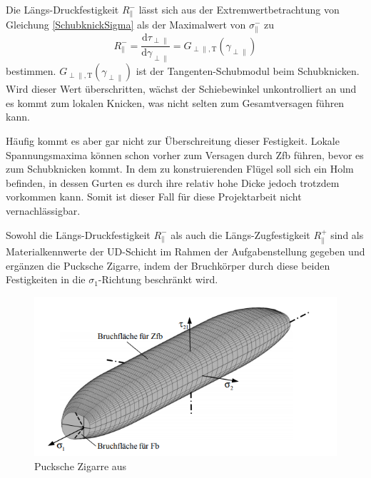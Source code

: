 Die Längs-Druckfestigkeit $R_\parallel^-$ lässt sich aus der Extremwertbetrachtung von Gleichung \ref{SchubknickSigma} als der Maximalwert von $\sigma_{\parallel}^-$ zu
\begin{equation}
	R_\parallel^- = \frac{\mathrm{d}\tau_{\perp\parallel}}{\mathrm{d}\gamma_{\perp\parallel}} = G_{\perp\parallel,\mathrm{T}}(\gamma_{\perp\parallel})
\end{equation}
bestimmen. $G_{\perp\parallel,\mathrm{T}}(\gamma_{\perp\parallel})$ ist der Tangenten-Schubmodul beim Schubknicken. Wird dieser Wert überschritten, wächst der Schiebewinkel unkontrolliert an und es kommt zum lokalen Knicken, was nicht selten zum Gesamtversagen führen kann.

\noindent Häufig kommt es aber gar nicht zur Überschreitung dieser Festigkeit. Lokale Spannungsmaxima können schon vorher zum Versagen durch Zfb führen, bevor es zum Schubknicken kommt. In dem zu konstruierenden Flügel soll sich ein Holm befinden, in dessen Gurten es durch ihre relativ hohe Dicke jedoch trotzdem vorkommen kann. Somit ist dieser Fall für diese Projektarbeit nicht vernachlässigbar.

\noindent Sowohl die Längs-Druckfestigkeit $R_\parallel^-$ als auch die Längs-Zugfestigkeit $R_\parallel^+$ sind als Materialkennwerte der UD-Schicht im Rahmen der Aufgabenstellung gegeben und ergänzen die Pucksche Zigarre, indem der Bruchkörper durch diese beiden Festigkeiten in die $\sigma_1$-Richtung beschränkt wird.
\begin{figure}
	\includegraphics[width=1.0\textwidth]{Bilder/Zigarre.png}
	\caption{Pucksche Zigarre aus \cite{item3}}
\end{figure} 
